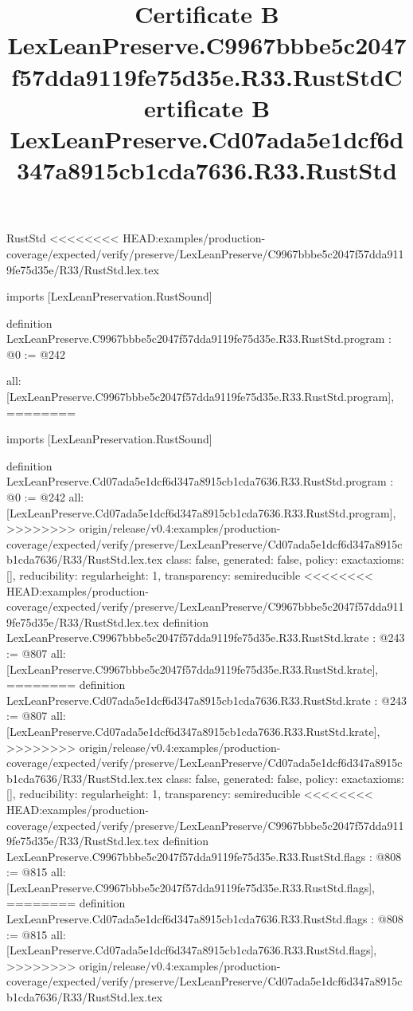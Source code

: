 \begin{lexlean}{RustStd}
<<<<<<<< HEAD:examples/production-coverage/expected/verify/preserve/LexLeanPreserve/C9967bbbe5c2047f57dda9119fe75d35e/R33/RustStd.lex.tex
\title{Certificate B LexLeanPreserve.C9967bbbe5c2047f57dda9119fe75d35e.R33.RustStd}
\begin{coremodule}
imports [LexLeanPreservation.RustSound]

definition LexLeanPreserve.C9967bbbe5c2047f57dda9119fe75d35e.R33.RustStd.program : @0 := @242 {
  all: [LexLeanPreserve.C9967bbbe5c2047f57dda9119fe75d35e.R33.RustStd.program],
========
\title{Certificate B LexLeanPreserve.Cd07ada5e1dcf6d347a8915cb1cda7636.R33.RustStd}
\begin{coremodule}
imports [LexLeanPreservation.RustSound]

definition LexLeanPreserve.Cd07ada5e1dcf6d347a8915cb1cda7636.R33.RustStd.program : @0 := @242 {
  all: [LexLeanPreserve.Cd07ada5e1dcf6d347a8915cb1cda7636.R33.RustStd.program],
>>>>>>>> origin/release/v0.4:examples/production-coverage/expected/verify/preserve/LexLeanPreserve/Cd07ada5e1dcf6d347a8915cb1cda7636/R33/RustStd.lex.tex
  class: false,
  generated: false,
  policy: exact{axioms: []},
  reducibility: regular{height: 1},
  transparency: semireducible
}
<<<<<<<< HEAD:examples/production-coverage/expected/verify/preserve/LexLeanPreserve/C9967bbbe5c2047f57dda9119fe75d35e/R33/RustStd.lex.tex
definition LexLeanPreserve.C9967bbbe5c2047f57dda9119fe75d35e.R33.RustStd.krate : @243 := @807 {
  all: [LexLeanPreserve.C9967bbbe5c2047f57dda9119fe75d35e.R33.RustStd.krate],
========
definition LexLeanPreserve.Cd07ada5e1dcf6d347a8915cb1cda7636.R33.RustStd.krate : @243 := @807 {
  all: [LexLeanPreserve.Cd07ada5e1dcf6d347a8915cb1cda7636.R33.RustStd.krate],
>>>>>>>> origin/release/v0.4:examples/production-coverage/expected/verify/preserve/LexLeanPreserve/Cd07ada5e1dcf6d347a8915cb1cda7636/R33/RustStd.lex.tex
  class: false,
  generated: false,
  policy: exact{axioms: []},
  reducibility: regular{height: 1},
  transparency: semireducible
}
<<<<<<<< HEAD:examples/production-coverage/expected/verify/preserve/LexLeanPreserve/C9967bbbe5c2047f57dda9119fe75d35e/R33/RustStd.lex.tex
definition LexLeanPreserve.C9967bbbe5c2047f57dda9119fe75d35e.R33.RustStd.flags : @808 := @815 {
  all: [LexLeanPreserve.C9967bbbe5c2047f57dda9119fe75d35e.R33.RustStd.flags],
========
definition LexLeanPreserve.Cd07ada5e1dcf6d347a8915cb1cda7636.R33.RustStd.flags : @808 := @815 {
  all: [LexLeanPreserve.Cd07ada5e1dcf6d347a8915cb1cda7636.R33.RustStd.flags],
>>>>>>>> origin/release/v0.4:examples/production-coverage/expected/verify/preserve/LexLeanPreserve/Cd07ada5e1dcf6d347a8915cb1cda7636/R33/RustStd.lex.tex
}}}
\end{coremodule}}
\end{coremodule}
\end{lexlean}
